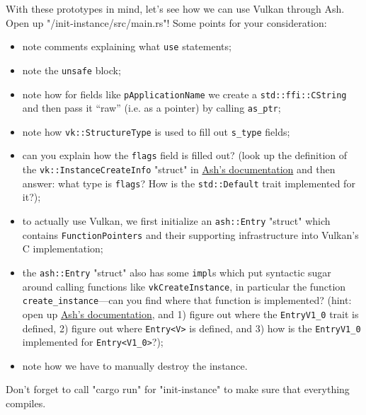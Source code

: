 \documentclass[12pt,letterpaper]{article}
\newcommand{\inquotes}[1]{``#1''}	%
\newcommand{\ril}[1]{\texttt{#1}}
\newcommand{\cil}[1]{\texttt{#1}}
\begin{document}
	With these prototypes in mind, let's see how we can use Vulkan through Ash. Open up "/init-instance/src/main.rs"! Some points for your consideration:
		\begin{itemize}
			\item note comments explaining what \ril{use} statements;
			
			\item note the \ril{unsafe} block;
			
			\item note how for fields like \cil{pApplicationName} we create a \ril{std::ffi::CString} and then pass it \inquotes{raw} (i.e. as a pointer) by calling \ril{as_ptr};
			
			\item note how \ril{vk::StructureType} is used to fill out \ril{s_type} fields;
			
			\item can you explain how the \ril{flags} field is filled out? (look up the definition of the \ril{vk::InstanceCreateInfo} "struct" in \href{https://docs.rs/ash}{Ash's documentation} and then answer: what type is \ril{flags}? How is the \ril{std::Default} trait implemented for it?);
			
			\item to actually use Vulkan, we first initialize an \ril{ash::Entry} "struct" which contains \ril{FunctionPointers} and their supporting infrastructure into Vulkan's C implementation;
			
			\item the \ril{ash::Entry} "struct" also has some \ril{impl}s which put syntactic sugar around calling functions like \ril{vkCreateInstance}, in particular the function \ril{create_instance}---can you find where that function is implemented? (hint: open up \href{https://docs.rs/ash}{Ash's documentation}, and 1) figure out where the \ril{EntryV1_0} trait is defined, 2) figure out where \ril{Entry<V>} is defined, and 3) how is the \ril{EntryV1_0} implemented for \ril{Entry<V1_0>}?);
			
			\item note how we have to manually destroy the instance.
		\end{itemize} 
	
	Don't forget to call "cargo run" for "init-instance" to make sure that everything compiles. 
	
\end{document}
